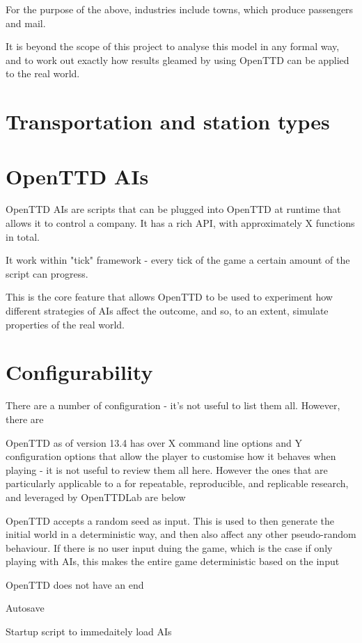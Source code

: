 \documentclass[logo,msc,dsti]{infthesis}    %
\begin{document}
For the purpose of the above, industries include towns, which produce passengers and mail.

It is beyond the scope of this project to analyse this model in any formal way, and to work out exactly how results gleamed by using OpenTTD can be applied to the real world.

\section{Transportation and station types}

\section{OpenTTD AIs}

OpenTTD AIs are scripts that can be plugged into OpenTTD at runtime that allows it to control a company. It has a rich API, with approximately X functions in total.

It work within "tick" framework - every tick of the game a certain amount of the script can progress.

This is the core feature that allows OpenTTD to be used to experiment how different strategies of AIs affect the outcome, and so, to an extent, simulate properties of the real world.

\section{Configurability}

There are a number of configuration - it's not useful to list them all. However, there are 

OpenTTD as of version 13.4 has over X command line options and Y configuration options that allow the player to customise how it behaves when playing - it is not useful to review them all here. However the ones that are particularly applicable to a for repeatable, reproducible, and replicable research, and leveraged by OpenTTDLab are below

\begin{itemize}
\begin{item}
OpenTTD accepts a random seed as input. This is used to then generate the initial world in a deterministic way, and then also affect any other pseudo-random behaviour. If there is no user input duing the game, which is the case if only playing with AIs, this makes the entire game deterministic based on the input
\end{item}
\begin{item}
OpenTTD does not have an end
\end{item}
\begin{item}
Autosave
\end{item}
\begin{item}
Startup script to immedaitely load AIs 
\end{item}
\end{itemize}
\end{document}
